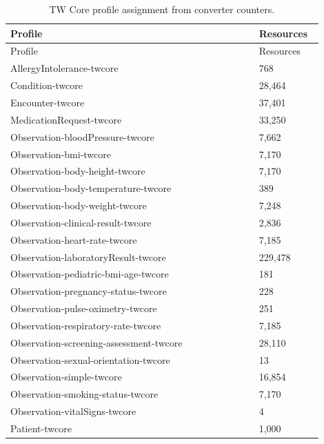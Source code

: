 {\small\setlength{\tabcolsep}{3pt}
\begin{longtable}{p{0.72\linewidth}p{0.18\linewidth}}
\caption{TW Core profile assignment from converter counters.}\label{sup:profiles}\\
\hline
Profile & Resources \\ \hline
\endfirsthead
\hline
Profile & Resources \\ \hline
\endhead
AllergyIntolerance-\allowbreak{}twcore & 768 \\
Condition-\allowbreak{}twcore & 28,464 \\
Encounter-\allowbreak{}twcore & 37,401 \\
MedicationRequest-\allowbreak{}twcore & 33,250 \\
Observation-\allowbreak{}bloodPressure-\allowbreak{}twcore & 7,662 \\
Observation-\allowbreak{}bmi-\allowbreak{}twcore & 7,170 \\
Observation-\allowbreak{}body-\allowbreak{}height-\allowbreak{}twcore & 7,170 \\
Observation-\allowbreak{}body-\allowbreak{}temperature-\allowbreak{}twcore & 389 \\
Observation-\allowbreak{}body-\allowbreak{}weight-\allowbreak{}twcore & 7,248 \\
Observation-\allowbreak{}clinical-\allowbreak{}result-\allowbreak{}twcore & 2,836 \\
Observation-\allowbreak{}heart-\allowbreak{}rate-\allowbreak{}twcore & 7,185 \\
Observation-\allowbreak{}laboratoryResult-\allowbreak{}twcore & 229,478 \\
Observation-\allowbreak{}pediatric-\allowbreak{}bmi-\allowbreak{}age-\allowbreak{}twcore & 181 \\
Observation-\allowbreak{}pregnancy-\allowbreak{}status-\allowbreak{}twcore & 228 \\
Observation-\allowbreak{}pulse-\allowbreak{}oximetry-\allowbreak{}twcore & 251 \\
Observation-\allowbreak{}respiratory-\allowbreak{}rate-\allowbreak{}twcore & 7,185 \\
Observation-\allowbreak{}screening-\allowbreak{}assessment-\allowbreak{}twcore & 28,110 \\
Observation-\allowbreak{}sexual-\allowbreak{}orientation-\allowbreak{}twcore & 13 \\
Observation-\allowbreak{}simple-\allowbreak{}twcore & 16,854 \\
Observation-\allowbreak{}smoking-\allowbreak{}status-\allowbreak{}twcore & 7,170 \\
Observation-\allowbreak{}vitalSigns-\allowbreak{}twcore & 4 \\
Patient-\allowbreak{}twcore & 1,000 \\
\hline\end{longtable}}

